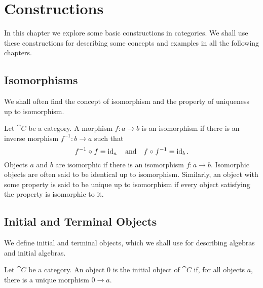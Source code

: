 \chapter{Constructions}
\label{chap:constructions}

In this chapter we explore some basic constructions in categories. We
shall use these constructions for describing some concepts and
examples in all the following chapters.

\section{Isomorphisms}
\label{sec:constructions-isomorphisms}

We shall often find the concept of isomorphism and the property of
uniqueness up to isomorphism.

\begin{definition}
  \label{def:isomorphism}


  Let $\cat{C}$ be a category. A morphism $f: a \to b$ is an
  isomorphism if there is an inverse morphism $f^{-1}: b \to a$ such
  that
  \begin{equation}
    \label{eq:isomorphism}
    f^{-1} \mathrel{\circ} f = \operatorname{id}_{a}
    \quad
    \text{and}
    \quad
    f \mathrel{\circ} f^{-1} = \operatorname{id}_{b}
    \text{.}
  \end{equation}
  Objects $a$ and $b$ are isomorphic if there is an isomorphism $f: a
  \to b$. Isomorphic objects are often said to be identical up to
  isomorphism. Similarly, an object with some property is said to be
  unique up to isomorphism if every object satisfying the property is
  isomorphic to it.

\end{definition}

\section{Initial and Terminal Objects}
\label{sec:constructions-initial-terminal-objects}

We define initial and terminal objects, which we shall use for
describing algebras and initial algebras.

\begin{definition}
  \label{def:initial-object}


  Let $\cat{C}$ be a category. An object $0$ is the initial object of
  $\cat{C}$ if, for all objects $a$, there is a unique morphism $0 \to
  a$.

\end{definition}

